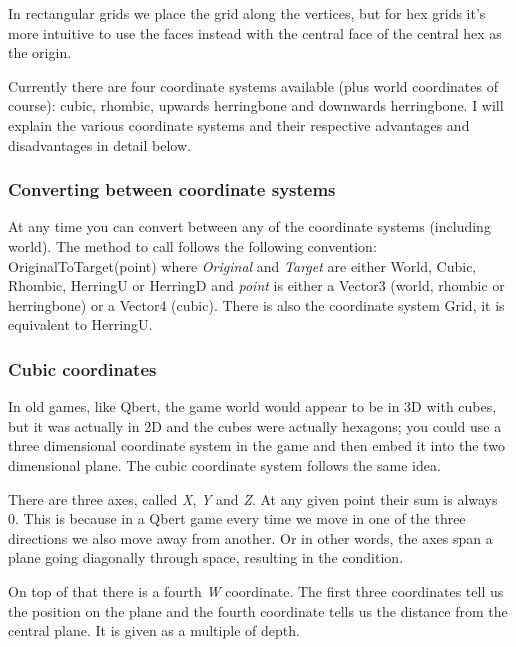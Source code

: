 In rectangular grids we place the grid along the vertices, but for hex grids it’s more intuitive to use the faces instead with the central face of the central hex as the origin.

Currently there are four coordinate systems available (plus world coordinates of course)\+: cubic, rhombic, upwards herringbone and downwards herringbone. I will explain the various coordinate systems and their respective advantages and disadvantages in detail below.

\subsubsection*{Converting between coordinate systems}

At any time you can convert between any of the coordinate systems (including world). The method to call follows the following convention\+: {\ttfamily Original\+To\+Target(point)} where {\itshape Original} and {\itshape Target} are either {\ttfamily World}, {\ttfamily Cubic}, {\ttfamily Rhombic}, {\ttfamily Herring\+U} or {\ttfamily Herring\+D} and {\itshape point} is either a Vector3 (world, rhombic or herringbone) or a Vector4 (cubic). There is also the coordinate system {\ttfamily Grid}, it is equivalent to {\ttfamily Herring\+U}.

\subsubsection*{Cubic coordinates}

In old games, like Qbert, the game world would appear to be in 3\+D with cubes, but it was actually in 2\+D and the cubes were actually hexagons; you could use a three dimensional coordinate system in the game and then embed it into the two dimensional plane. The cubic coordinate system follows the same idea.



There are three axes, called {\itshape X}, {\itshape Y} and {\itshape Z}. At any given point their sum is always 0. This is because in a Qbert game every time we move in one of the three directions we also move away from another. Or in other words, the axes span a plane going diagonally through space, resulting in the condition.

On top of that there is a fourth {\itshape W} coordinate. The first three coordinates tell us the position on the plane and the fourth coordinate tells us the distance from the central plane. It is given as a multiple of {\ttfamily depth}.

